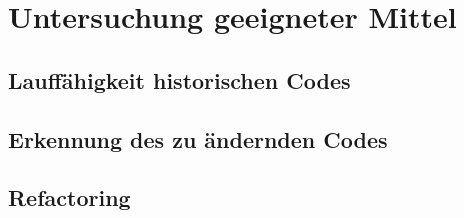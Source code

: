 \chapter{Untersuchung geeigneter Mittel}\label{ch:personal} 

\section{Lauffähigkeit historischen Codes}

\section{Erkennung des zu ändernden Codes}

\section{Refactoring}